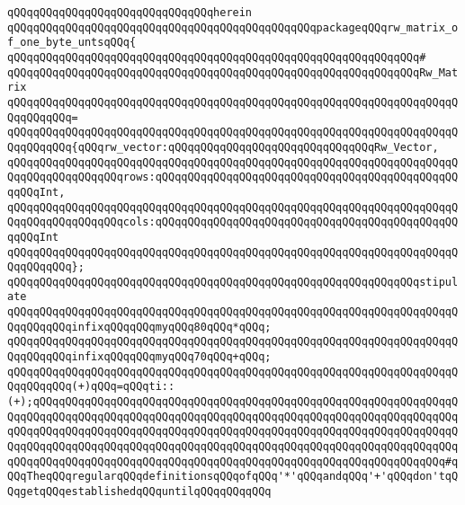\verb|qQQqqQQqqQQqqQQqqQQqqQQqqQQqqQQqherein|\newline
\verb|qQQqqQQqqQQqqQQqqQQqqQQqqQQqqQQqqQQqqQQqqQQqqQQqpackageqQQqrw_matrix_of_one_byte_untsqQQq{|\newline
\verb|qQQqqQQqqQQqqQQqqQQqqQQqqQQqqQQqqQQqqQQqqQQqqQQqqQQqqQQqqQQqqQQq#|\newline
\verb|qQQqqQQqqQQqqQQqqQQqqQQqqQQqqQQqqQQqqQQqqQQqqQQqqQQqqQQqqQQqqQQqRw_Matrix|\newline
\verb|qQQqqQQqqQQqqQQqqQQqqQQqqQQqqQQqqQQqqQQqqQQqqQQqqQQqqQQqqQQqqQQqqQQqqQQqqQQqqQQq=|\newline
\verb|qQQqqQQqqQQqqQQqqQQqqQQqqQQqqQQqqQQqqQQqqQQqqQQqqQQqqQQqqQQqqQQqqQQqqQQqqQQqqQQq{qQQqrw_vector:qQQqqQQqqQQqqQQqqQQqqQQqqQQqqQQqRw_Vector,|\newline
\verb|qQQqqQQqqQQqqQQqqQQqqQQqqQQqqQQqqQQqqQQqqQQqqQQqqQQqqQQqqQQqqQQqqQQqqQQqqQQqqQQqqQQqqQQqrows:qQQqqQQqqQQqqQQqqQQqqQQqqQQqqQQqqQQqqQQqqQQqqQQqqQQqInt,|\newline
\verb|qQQqqQQqqQQqqQQqqQQqqQQqqQQqqQQqqQQqqQQqqQQqqQQqqQQqqQQqqQQqqQQqqQQqqQQqqQQqqQQqqQQqqQQqcols:qQQqqQQqqQQqqQQqqQQqqQQqqQQqqQQqqQQqqQQqqQQqqQQqqQQqInt|\newline
\verb|qQQqqQQqqQQqqQQqqQQqqQQqqQQqqQQqqQQqqQQqqQQqqQQqqQQqqQQqqQQqqQQqqQQqqQQqqQQqqQQq};|\newline
\newline
\verb|qQQqqQQqqQQqqQQqqQQqqQQqqQQqqQQqqQQqqQQqqQQqqQQqqQQqqQQqqQQqqQQqstipulate|\newline
\newline
\verb|qQQqqQQqqQQqqQQqqQQqqQQqqQQqqQQqqQQqqQQqqQQqqQQqqQQqqQQqqQQqqQQqqQQqqQQqqQQqqQQqinfixqQQqqQQqmyqQQq80qQQq*qQQq;|\newline
\verb|qQQqqQQqqQQqqQQqqQQqqQQqqQQqqQQqqQQqqQQqqQQqqQQqqQQqqQQqqQQqqQQqqQQqqQQqqQQqqQQqinfixqQQqqQQqmyqQQq70qQQq+qQQq;|\newline
\newline
\verb|qQQqqQQqqQQqqQQqqQQqqQQqqQQqqQQqqQQqqQQqqQQqqQQqqQQqqQQqqQQqqQQqqQQqqQQqqQQqqQQq(+)qQQq=qQQqti::(+);qQQqqQQqqQQqqQQqqQQqqQQqqQQqqQQqqQQqqQQqqQQqqQQqqQQqqQQqqQQqqQQqqQQqqQQqqQQqqQQqqQQqqQQqqQQqqQQqqQQqqQQqqQQqqQQqqQQqqQQqqQQqqQQqqQQqqQQqqQQqqQQqqQQqqQQqqQQqqQQqqQQqqQQqqQQqqQQqqQQqqQQqqQQqqQQqqQQqqQQqqQQqqQQqqQQqqQQqqQQqqQQqqQQqqQQqqQQqqQQqqQQqqQQqqQQqqQQqqQQqqQQqqQQqqQQqqQQqqQQqqQQqqQQqqQQqqQQqqQQqqQQqqQQqqQQqqQQqqQQqqQQqqQQqqQQqqQQqqQQqqQQq#qQQqTheqQQqregularqQQqdefinitionsqQQqofqQQq'*'qQQqandqQQq'+'qQQqdon'tqQQqgetqQQqestablishedqQQquntilqQQqqQQqqQQq|\newline
